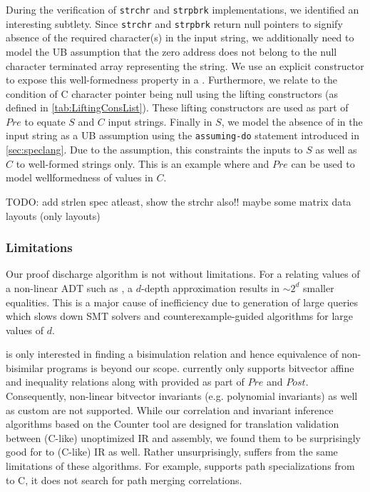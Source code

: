 During the verification of {\tt strchr} and {\tt strpbrk} implementations,
we identified an interesting subtlety. Since {\tt strchr} and {\tt strpbrk}
return null pointers to signify absence of the required character(s) in the input string,
we additionally need to model the UB assumption that the zero
address does not belong to the null character terminated array representing the string.
We use an explicit constructor  to expose this well-formedness property in a \SpecL{} .
Furthermore, we relate  to the condition of C character pointer being null using the
lifting constructors  (as defined in \cref{tab:LiftingConsList}).
These lifting constructors are used as part of $Pre$ to equate $S$ and $C$ input strings.
Finally in $S$, we model the absence of  in the input string as a UB assumption using
the {\tt assuming-do} statement introduced in \cref{sec:speclang}.
Due to the \sdef{} assumption, this constraints the inputs to $S$ as well as $C$ to well-formed strings only.
This is an example where \sdef{} and $Pre$ can be used to model wellformedness of values in $C$.

TODO: add strlen spec atleast, show the strchr also!! maybe some matrix data layouts (only layouts)

\subsubsection{Limitations}
\label{sec:limitations}
Our proof discharge algorithm is not without limitations.
For a \recursiveRelation{} relating values of a non-linear ADT such as , a $d$-depth
approximation results in $\sim 2^d$ smaller equalities. This is a major cause of inefficiency due to
generation of large queries which slows down SMT solvers and counterexample-guided algorithms for large values of $d$.

\toolName{} is only interested in finding a bisimulation relation and hence
equivalence of non-bisimilar programs is beyond our scope.
\toolName{} currently only supports bitvector affine and inequality relations
along with \recursiveRelations{} provided as part of $Pre$ and $Post$.
Consequently, non-linear bitvector invariants (e.g. polynomial invariants)
as well as custom \recursiveRelations{} are not supported.
While our correlation and invariant inference algorithms based on the Counter tool \cite{oopsla20}
are designed for translation validation between (C-like) unoptimized IR and assembly, we found them
to be surprisingly good for \SpecL{} to (C-like) IR as well. Rather unsurprisingly, \toolName{}
suffers from the same limitations of these algorithms. For example, \toolName{} supports path
specializations from \SpecL{} to C, it does not search for path merging correlations.